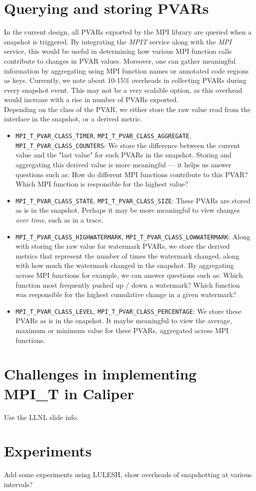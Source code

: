 \section{Querying and storing PVARs}
In the current design, all PVARs exported by the MPI library are queried when a snapshot is triggered. By integrating the \emph{MPIT} service along with the \emph{MPI} service, this would be useful in determining how various MPI function calls contribute to changes in PVAR values. Moreover, one can gather meaningful information by aggregating using MPI function names or annotated code regions as keys. Currently, we note about 10-15\% overheads in collecting PVARs during every snapshot event. This may not be a very scalable option, as this overhead would increase with a rise in number of PVARs exported.\\
Depending on the class of the PVAR, we either store the raw value read from the interface in the snapshot, or a derived metric.
\begin{itemize}
	\item \verb+MPI_T_PVAR_CLASS_TIMER+, \verb+MPI_T_PVAR_CLASS_AGGREGATE+, \\\verb+MPI_T_PVAR_CLASS_COUNTERS+: We store the difference between the current value and the "last value" for such PVARs in the snapshot. Storing and aggregating this derived value is more meaningful --- it helps us answer questions such as: How do different MPI functions contribute to this PVAR? Which MPI function is responsible for the highest value?
	\item \verb+MPI_T_PVAR_CLASS_STATE+, \verb+MPI_T_PVAR_CLASS_SIZE+: These PVARs are stored as is in the snapshot. Perhaps it may be more meaningful to view changes \emph{over time}, such as in a trace.
	\item \verb+MPI_T_PVAR_CLASS_HIGHWATERMARK+, \verb+MPI_T_PVAR_CLASS_LOWWATERMARK+: Along with storing the raw value for watermark PVARs, we store the derived metrics that represent the number of times the watermark changed, along with how much the watermark changed in the snapshot. By aggregating across MPI functions for example, we can answer questions such as: Which function most frequently pushed up / down a watermark? Which function was responsible for the highest cumulative change in a given watermark?
	\item \verb+MPI_T_PVAR_CLASS_LEVEL+, \verb+MPI_T_PVAR_CLASS_PERCENTAGE+: We store these PVARs as is in the snapshot. It maybe meaningful to view the average, maximum or minimum value for these PVARs, aggregated across MPI functions.
\end{itemize}

\section {Challenges in implementing MPI\_T in Caliper}
Use the LLNL slide info.

\section {Experiments}
Add some experiments using LULESH, show overheads of snapshotting at various intervals?
